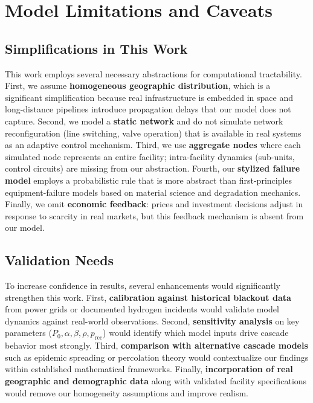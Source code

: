 \documentclass[12pt,a4paper,twoside]{report}
\begin{document}
\section{Model Limitations and Caveats}

\subsection{Simplifications in This Work}

This work employs several necessary abstractions for computational tractability. First, we assume \textbf{homogeneous geographic distribution}, which is a significant simplification because real infrastructure is embedded in space and long-distance pipelines introduce propagation delays that our model does not capture. Second, we model a \textbf{static network} and do not simulate network reconfiguration (line switching, valve operation) that is available in real systems as an adaptive control mechanism. Third, we use \textbf{aggregate nodes} where each simulated node represents an entire facility; intra-facility dynamics (sub-units, control circuits) are missing from our abstraction. Fourth, our \textbf{stylized failure model} employs a probabilistic rule that is more abstract than first-principles equipment-failure models based on material science and degradation mechanics. Finally, we omit \textbf{economic feedback}: prices and investment decisions adjust in response to scarcity in real markets, but this feedback mechanism is absent from our model.

\subsection{Validation Needs}

To increase confidence in results, several enhancements would significantly strengthen this work. First, \textbf{calibration against historical blackout data} from power grids or documented hydrogen incidents would validate model dynamics against real-world observations. Second, \textbf{sensitivity analysis} on key parameters ($P_0, \alpha, \beta, \rho, p_{\text{rec}}$) would identify which model inputs drive cascade behavior most strongly. Third, \textbf{comparison with alternative cascade models} such as epidemic spreading or percolation theory would contextualize our findings within established mathematical frameworks. Finally, \textbf{incorporation of real geographic and demographic data} along with validated facility specifications would remove our homogeneity assumptions and improve realism.
\end{document}

